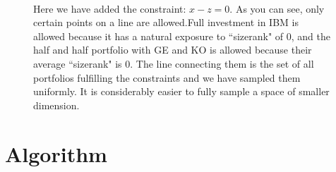 \documentclass{article}\usepackage{graphicx, color}
\begin{document}
\begin{figure}[h]
{ \\ \protect{} Here we have added the constraint: $x-z=0$. As you can see, only certain points on a line are allowed.Full investment in IBM is allowed because it has a natural exposure to ``sizerank" of 0, and the half and half portfolio with GE and KO is allowed because their average ``sizerank" is 0. The line connecting them is the set of all portfolios fulfilling the constraints and we have sampled them uniformly. It is considerably easier to fully sample a space of smaller dimension.}
 \label{trifig}
\end{figure}

\section*{Algorithm} 
\end{document}
